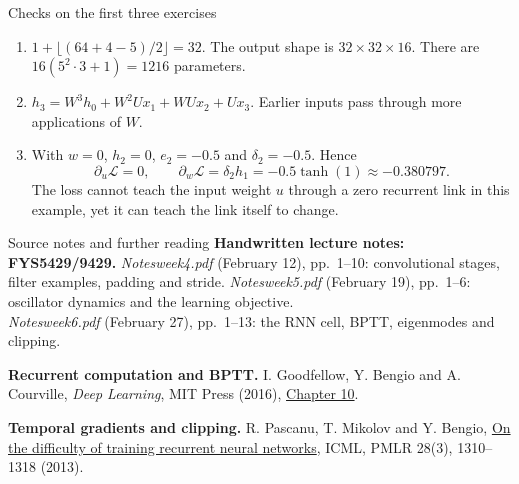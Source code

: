 \documentclass[aspectratio=169,11pt]{beamer}
\begin{document}
\begin{frame}{Checks on the first three exercises}
\begin{enumerate}
\item $1+\lfloor(64+4-5)/2\rfloor=32$. The output shape is $32\times32\times16$.
There are $16(5^2\cdot3+1)=1216$ parameters.
\item $h_3=W^3h_0+W^2Ux_1+WUx_2+Ux_3$. Earlier inputs pass through more
applications of $W$.
\item With $w=0$, $h_2=0$, $e_2=-0.5$ and $\delta_2=-0.5$. Hence
\[
\partial_u\mathcal L=0,\qquad
\partial_w\mathcal L=\delta_2h_1=-0.5\tanh(1)\approx-0.380797 .
\]
The loss cannot teach the input weight $u$ through a zero recurrent link in
this example, yet it can teach the link itself to change.
\end{enumerate}
\end{frame}
\begin{frame}{Source notes and further reading}
\textbf{Handwritten lecture notes: FYS5429/9429.}
\emph{Notesweek4.pdf} (February 12), pp.\ 1--10: convolutional stages,
filter examples, padding and stride. \emph{Notesweek5.pdf} (February 19),
pp.\ 1--6: oscillator dynamics and the learning objective. \\ \emph{Notesweek6.pdf} (February 27), pp.\ 1--13: the RNN cell, BPTT, eigenmodes and clipping.
\par\medskip
\textbf{Recurrent computation and BPTT.}
I. Goodfellow, Y. Bengio and A. Courville, \emph{Deep Learning}, MIT Press
(2016), \href{https://www.deeplearningbook.org/contents/rnn.html}{Chapter 10}.
\par\medskip
\textbf{Temporal gradients and clipping.}
R. Pascanu, T. Mikolov and Y. Bengio,
\href{https://proceedings.mlr.press/v28/pascanu13.html}{On the difficulty of training recurrent neural networks},
ICML, PMLR 28(3), 1310--1318 (2013).
\end{frame}
\end{document}
